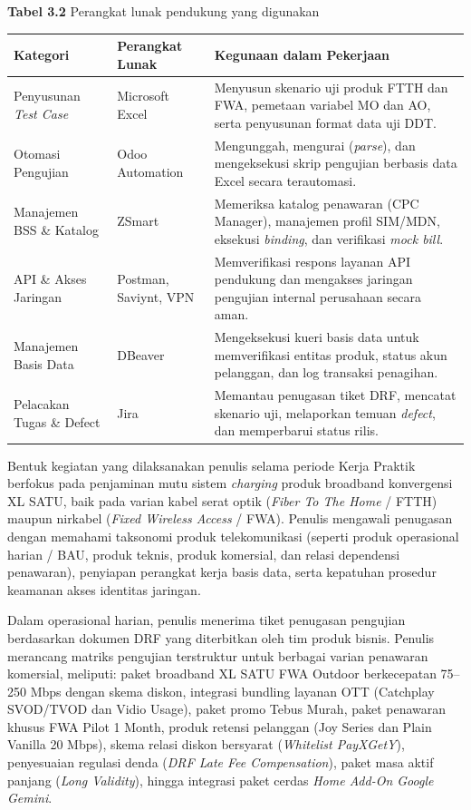 \documentclass[12pt,a4paper]{article}
\begin{document}
\vspace{0.3cm}
\noindent\textbf{Tabel 3.2} Perangkat lunak pendukung yang digunakan
\vspace{0.1cm}

\noindent
\begin{tabularx}{\textwidth}{|l|l|X|}
\hline
\textbf{Kategori} & \textbf{Perangkat Lunak} & \textbf{Kegunaan dalam Pekerjaan} \\
\hline
Penyusunan \textit{Test Case} & Microsoft Excel & Menyusun skenario uji produk FTTH dan FWA, pemetaan variabel MO dan AO, serta penyusunan format data uji DDT. \\
\hline
Otomasi Pengujian & Odoo Automation & Mengunggah, mengurai (\textit{parse}), dan mengeksekusi skrip pengujian berbasis data Excel secara terautomasi. \\
\hline
Manajemen BSS \& Katalog & ZSmart & Memeriksa katalog penawaran (CPC Manager), manajemen profil SIM/MDN, eksekusi \textit{binding}, dan verifikasi \textit{mock bill}. \\
\hline
API \& Akses Jaringan & Postman, Saviynt, VPN & Memverifikasi respons layanan API pendukung dan mengakses jaringan pengujian internal perusahaan secara aman. \\
\hline
Manajemen Basis Data & DBeaver & Mengeksekusi kueri basis data untuk memverifikasi entitas produk, status akun pelanggan, dan log transaksi penagihan. \\
\hline
Pelacakan Tugas \& Defect & Jira & Memantau penugasan tiket DRF, mencatat skenario uji, melaporkan temuan \textit{defect}, dan memperbarui status rilis. \\
\hline
\end{tabularx}

\vspace{0.4cm}
Bentuk kegiatan yang dilaksanakan penulis selama periode Kerja Praktik berfokus pada penjaminan mutu sistem \textit{charging} produk broadband konvergensi XL SATU, baik pada varian kabel serat optik (\textit{Fiber To The Home} / FTTH) maupun nirkabel (\textit{Fixed Wireless Access} / FWA). Penulis mengawali penugasan dengan memahami taksonomi produk telekomunikasi (seperti produk operasional harian / BAU, produk teknis, produk komersial, dan relasi dependensi penawaran), penyiapan perangkat kerja basis data, serta kepatuhan prosedur keamanan akses identitas jaringan.

Dalam operasional harian, penulis menerima tiket penugasan pengujian berdasarkan dokumen DRF yang diterbitkan oleh tim produk bisnis. Penulis merancang matriks pengujian terstruktur untuk berbagai varian penawaran komersial, meliputi: paket broadband XL SATU FWA Outdoor berkecepatan 75--250 Mbps dengan skema diskon, integrasi bundling layanan OTT (Catchplay SVOD/TVOD dan Vidio Usage), paket promo Tebus Murah, paket penawaran khusus FWA Pilot 1 Month, produk retensi pelanggan (Joy Series dan Plain Vanilla 20 Mbps), skema relasi diskon bersyarat (\textit{Whitelist PayXGetY}), penyesuaian regulasi denda (\textit{DRF Late Fee Compensation}), paket masa aktif panjang (\textit{Long Validity}), hingga integrasi paket cerdas \textit{Home Add-On Google Gemini}.
\end{document}
